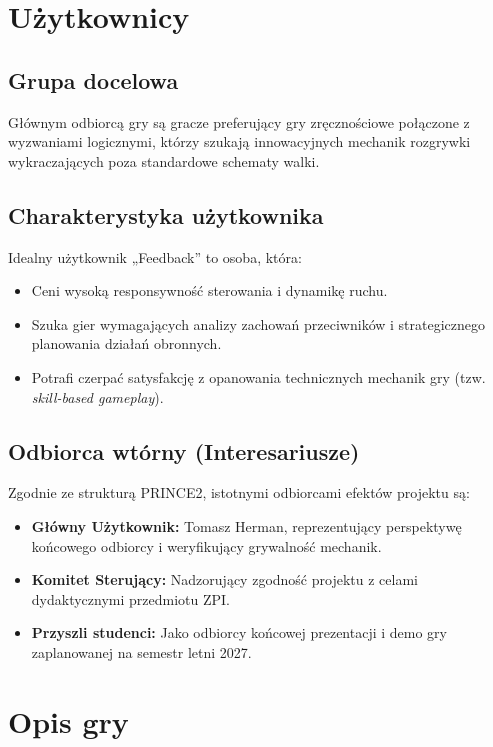 \documentclass[11pt,a4paper]{article}
\begin{document}
\section{Użytkownicy}

\subsection{Grupa docelowa}
Głównym odbiorcą gry są gracze preferujący gry zręcznościowe połączone z wyzwaniami logicznymi, którzy szukają innowacyjnych mechanik rozgrywki wykraczających poza standardowe schematy walki.

\subsection{Charakterystyka użytkownika}
Idealny użytkownik „Feedback” to osoba, która:
\begin{itemize}[noitemsep]
    \item Ceni wysoką responsywność sterowania i dynamikę ruchu.
    \item Szuka gier wymagających analizy zachowań przeciwników i strategicznego planowania działań obronnych.
    \item Potrafi czerpać satysfakcję z opanowania technicznych mechanik gry (tzw. \textit{skill-based gameplay}).
\end{itemize}

\subsection{Odbiorca wtórny (Interesariusze)}
Zgodnie ze strukturą PRINCE2, istotnymi odbiorcami efektów projektu są:
\begin{itemize}[noitemsep]
    \item \textbf{Główny Użytkownik:} Tomasz Herman, reprezentujący perspektywę końcowego odbiorcy i weryfikujący grywalność mechanik.
    \item \textbf{Komitet Sterujący:} Nadzorujący zgodność projektu z celami dydaktycznymi przedmiotu ZPI.
    \item \textbf{Przyszli studenci:} Jako odbiorcy końcowej prezentacji i demo gry zaplanowanej na semestr letni 2027.
\end{itemize}

\section{Opis gry}
\end{document}
